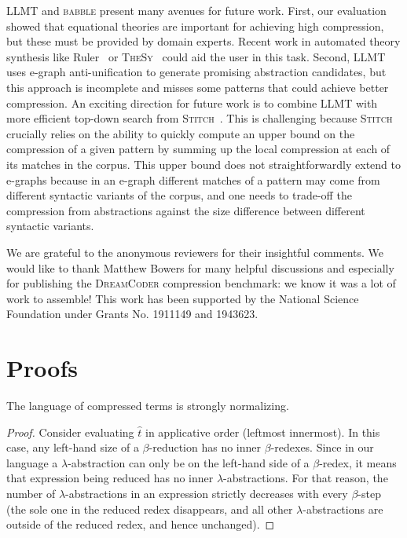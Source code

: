 \documentclass[acmsmall,screen,nonacm,review=false,timestamp=false]{acmart}
\newcommand{\tname}[1]{\textsc{#1}\xspace}
\newcommand{\tool}{\tname{babble}}
\newcommand{\dc}{\tname{DreamCoder}}
\newcommand{\stitch}{\tname{Stitch}}
\begin{document}
LLMT and \tool present many avenues for future work.
First,
 our evaluation showed that equational theories are important
 for achieving high compression,
 but these must be provided by domain experts.
Recent work in automated theory synthesis like
 Ruler~\cite{ruler} or \tname{TheSy}~\cite{thesy}
 could aid the user in this task.
Second,
 LLMT uses e-graph anti-unification to generate
 promising abstraction candidates, 
 but this approach is incomplete and misses some patterns
 that could achieve better compression.
An exciting direction for future work is to combine LLMT 
with more efficient top-down search from \stitch~\cite{stitch}.
This is challenging because \stitch crucially relies on the ability 
to quickly compute an upper bound on the compression of a given pattern 
by summing up the local compression at each of its matches in the corpus.
This upper bound does not straightforwardly extend to e-graphs
because in an e-graph different matches of a pattern may come from different syntactic variants of the corpus,
and one needs to trade-off the compression from abstractions
against the size difference between different syntactic variants. 
\begin{acks}
  We are grateful to the anonymous reviewers for their insightful comments.
We would like to thank Matthew Bowers for many helpful discussions
  and especially for publishing the \dc compression benchmark:
  we know it was a lot of work to assemble!
This work has been supported by the National Science Foundation under Grants No. 1911149 and 1943623.
\end{acks}
  




\clearpage
\appendix
\section{Proofs}\label{app:proofs}

\begin{proposition}
  The language of compressed terms is strongly normalizing.
\end{proposition}

\begin{proof}
  Consider evaluating $\hat{t}$ in applicative order (leftmost innermost).
In this case, any left-hand size of a $\beta$-reduction has no inner $\beta$-redexes.
Since in our language a $\lambda$-abstraction can only be on the left-hand side of a $\beta$-redex,
  it means that expression being reduced has no inner $\lambda$-abstractions.
For that reason, the number of $\lambda$-abstractions in an expression strictly decreases with every $\beta$-step
  (the sole one in the reduced redex disappears, and all other $\lambda$-abstractions are outside of the reduced redex, and hence unchanged).
\end{proof}
\end{document}
